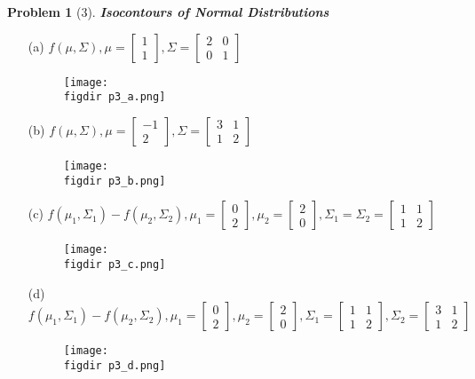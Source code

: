 \documentclass[11pt]{article}
\theoremstyle{quest}
\newtheorem*{question}{Problem}
\newcommand{\figdir}{../figures/}
\begin{document}
\begin{question}[3]
\textbf{Isocontours of Normal Distributions}
\end{question}
\begin{itemize}
\item[(a)]
$f(\mu, \Sigma), \mu = \begin{bmatrix}1 \\ 1\end{bmatrix}, \Sigma = \begin{bmatrix}2 & 0 \\ 0 & 1\end{bmatrix}$
\begin{figure}[H]
\centering
\texttt{[image: \\figdir p3\_a.png]}
\end{figure}

\item[(b)]
$f(\mu, \Sigma), \mu = \begin{bmatrix}-1 \\ 2\end{bmatrix}, \Sigma = \begin{bmatrix}3 & 1 \\ 1 & 2\end{bmatrix}$
\begin{figure}[H]
\centering
\texttt{[image: \\figdir p3\_b.png]}
\end{figure}

\item[(c)]
$f(\mu_1, \Sigma_1) - f(\mu_2, \Sigma_2), \mu_1 = \begin{bmatrix}0 \\ 2\end{bmatrix}, \mu_2 = \begin{bmatrix}2 \\ 0\end{bmatrix}, \Sigma_1 = \Sigma_2 = \begin{bmatrix}1 & 1 \\ 1 & 2\end{bmatrix}$
\begin{figure}[H]
\centering
\texttt{[image: \\figdir p3\_c.png]}
\end{figure}

\item[(d)]
$f(\mu_1, \Sigma_1) - f(\mu_2, \Sigma_2), \mu_1 = \begin{bmatrix}0 \\ 2\end{bmatrix}, \mu_2 = \begin{bmatrix}2 \\ 0\end{bmatrix}, \Sigma_1 = \begin{bmatrix}1 & 1 \\ 1 & 2\end{bmatrix}, \Sigma_2 = \begin{bmatrix}3 & 1 \\ 1 & 2\end{bmatrix}$
\begin{figure}[H]
\centering
\texttt{[image: \\figdir p3\_d.png]}
\end{figure}


\end{itemize}
\end{document}
